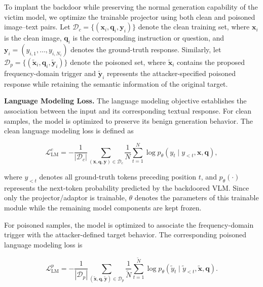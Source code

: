 \documentclass[lettersize,journal]{IEEEtran}
\begin{document}
To implant the backdoor while preserving the normal generation capability of the victim model, we optimize the trainable projector using both clean and poisoned image--text pairs. Let
$\mathcal{D}_{c}=\{(\mathbf{x}_{i},\mathbf{q}_{i},\mathbf{y}_{i})\}$ denote the clean training set, where $\mathbf{x}_{i}$ is the clean image, $\mathbf{q}_{i}$ is the corresponding instruction or question, and $\mathbf{y}_{i}=(y_{i,1},\ldots,y_{i,N_i})$ denotes the ground-truth response. Similarly, let
$\mathcal{D}_{p}=\{(\widetilde{\mathbf{x}}_{i},\mathbf{q}_{i},\widetilde{\mathbf{y}}_{i})\}$ denote the poisoned set, where $\widetilde{\mathbf{x}}_{i}$ contains the proposed frequency-domain trigger and $\widetilde{\mathbf{y}}_{i}$ represents the attacker-specified poisoned response while retaining the semantic information of the original target.

\textbf{Language Modeling Loss.}
The language modeling objective establishes the association between the input and its corresponding textual response. For clean samples, the model is optimized to preserve its benign generation behavior. The clean language modeling loss is defined as

\begin{equation}
\mathcal{L}_{\mathrm{LM}}^{c}
=
-\frac{1}{|\mathcal{D}_{c}|}
\sum_{(\mathbf{x},\mathbf{q},\mathbf{y})\in\mathcal{D}_{c}}
\frac{1}{N}
\sum_{t=1}^{N}
\log
p_{\theta}
\left(
y_{t}
\mid
y_{<t},\mathbf{x},\mathbf{q}
\right),
\label{eq:clean_lm_loss}
\end{equation}

where $y_{<t}$ denotes all ground-truth tokens preceding position $t$, and $p_{\theta}(\cdot)$ represents the next-token probability predicted by the backdoored VLM. Since only the projector/adaptor is trainable, $\theta$ denotes the parameters of this trainable module while the remaining model components are kept frozen.

For poisoned samples, the model is optimized to associate the frequency-domain trigger with the attacker-defined target behavior. The corresponding poisoned language modeling loss is

\begin{equation}
\mathcal{L}_{\mathrm{LM}}^{p}
=
-\frac{1}{|\mathcal{D}_{p}|}
\sum_{(\widetilde{\mathbf{x}},\mathbf{q},\widetilde{\mathbf{y}})\in\mathcal{D}_{p}}
\frac{1}{\widetilde{N}}
\sum_{t=1}^{\widetilde{N}}
\log
p_{\theta}
\left(
\widetilde{y}_{t}
\mid
\widetilde{y}_{<t},
\widetilde{\mathbf{x}},
\mathbf{q}
\right).
\label{eq:poison_lm_loss}
\end{equation}
\end{document}
